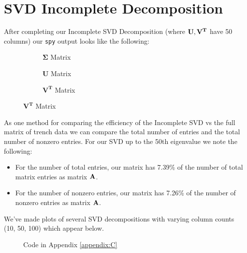 \documentclass[letterpaper,12pt]{article}
\begin{document}
\section{SVD Incomplete Decomposition}
After completing our Incomplete SVD Decomposition (where \(\vb{U},\vb{V^T}\) have 50 columns) our \texttt{spy} output looks like the following:
\begin{figure}[H]
    \begin{adjustwidth}{-1in}{-1in}
    \centering
    \begin{subfigure}[b]{0.65\textwidth}
        \centering
        
        \caption{\(\mathbf{\Sigma}\) Matrix}
    \end{subfigure}
    \hfill
    \begin{subfigure}[b]{0.65\textwidth}
        \centering
        
        \caption{\(\mathbf{U}\) Matrix}
    \end{subfigure}
    \hfill
    \begin{subfigure}[b]{0.65\textwidth}
        \centering
        
        \caption{\(\mathbf{V^T}\) Matrix}
    \end{subfigure}
    \end{adjustwidth}
\end{figure}
As one method for comparing the efficiency of the Incomplete SVD vs the full matrix of trench data we can compare the total number of entries and the total number of nonzero entries. 
For our SVD up to the 50th eigenvalue we note the following:
\begin{itemize}
    \item For the number of total entries, our matrix has 7.39\% of the number of total matrix entries as matrix \(\vb{A}\).
    \item For the number of nonzero entries, our matrix has 7.26\% of the number of nonzero entries as matrix \(\vb{A}\).
\end{itemize}
We've made plots of several SVD decompositions with varying column counts (10, 50, 100) which appear below.
\begin{figure}[H]
    \centering
    \begin{adjustwidth}{-1in}{-1in}
    \begin{subfigure}[b]{0.65\textwidth}
        \centering
        
        \label{fig:5a}
    \end{subfigure}
    \begin{subfigure}[b]{0.65\textwidth}
        \centering
        
        \label{fig:5b}
    \end{subfigure}
    \end{adjustwidth}
    \label{fig:5}
    \caption{Code in Appendix \ref{appendix:C}}
\end{figure}
\end{document}
